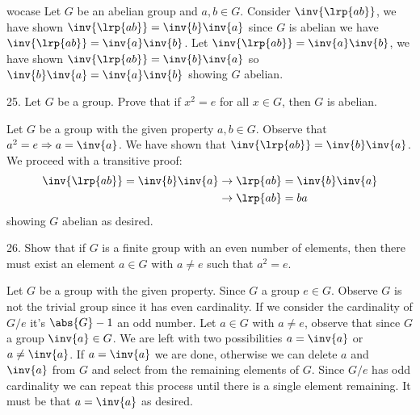 \begin{mdframed}[style=darkAnswer,frametitle={Joe Starr}]
wocase{
    Let $G$ be an abelian group and $a,b\in G$. Consider $\inv{\lrp{ab}}$, we have
    shown $\inv{\lrp{ab}}=\inv{b}\inv{a}$ since $G$ is abelian we have
    $\inv{\lrp{ab}}=\inv{a}\inv{b}$.
  }{
    Let $\inv{\lrp{ab}}=\inv{a}\inv{b}$, we have shown
    $\inv{\lrp{ab}}=\inv{b}\inv{a}$ so $\inv{b}\inv{a}=\inv{a}\inv{b}$ showing $G$
    abelian.
  }
\end{mdframed}
\newpage
\begin{mdframed}[style=darkQuesion]
25. Let $G$ be a group. Prove that if $x^2=e$ for all $x\in G$, then $G$ is
abelian.
\end{mdframed}

\begin{mdframed}[style=darkAnswer,frametitle={Joe Starr}]
Let $G$ be a group with the given property $a,b\in G$. Observe that
$a^2=e \Rightarrow a=\inv{a}$. We have shown that
$\inv{\lrp{ab}}=\inv{b}\inv{a}$.
We proceed with a transitive proof:
\begin{align*}
\inv{\lrp{ab}}=\inv{b}\inv{a} & \rightarrow \lrp{ab}=\inv{b}\inv{a} \\
& \rightarrow \lrp{ab}={b}{a}
\end{align*}
showing $G$ abelian as desired.
\end{mdframed}
\newpage
\begin{mdframed}[style=darkQuesion]
26. Show that if $G$ is a finite group with an even number of elements, then
there must exist an element $a\in G$ with $a\neq e$ such that $a^2=e$.
\end{mdframed}

\begin{mdframed}[style=darkAnswer,frametitle={Joe Starr}]
Let $G$ be a group with the given property. Since $G$ a group $e\in G$.
Observe $G$ is not the trivial group since it has even cardinality.
If we consider the cardinality of $G/e$ it's $\abs{G}-1$ an odd number.
Let $a\in G$ with $a\neq e$, observe that since $G$ a group $\inv{a}\in G$.
We are left with two possibilities $a=\inv{a}$ or $a\neq \inv{a}$.
If $a=\inv{a}$ we are done, otherwise we can delete $a$ and $\inv{a}$ from $G$
and select from the remaining elements of $G$. Since $G/e$ has odd cardinality
we can repeat this process until there is a single element remaining. It must
be that $a=\inv{a}$ as desired.
\end{mdframed}
